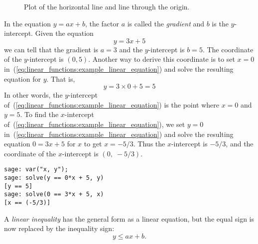\begin{figure}[!htbp]
\centering
\quad
\caption{Plot of the horizontal line and line through the origin.}
\end{figure}

In the equation $y = ax + b$, the factor $a$ is called the
\emph{gradient} and $b$ is the $y$-intercept. Given the equation
%
\begin{equation}
\label{eq:linear_functions:example_linear_equation}
y
=
3x + 5
\end{equation}
%
we can tell that the gradient is $a = 3$ and the $y$-intercept is
$b = 5$. The coordinate of the $y$-intercept is $(0, 5)$. Another way
to derive this coordinate is to set $x = 0$
in~(\ref{eq:linear_functions:example_linear_equation}) and solve the
resulting equation for $y$. That is,
\[
y
=
3 \times 0 + 5
=
5
\]
In other words, the $y$-intercept
of~(\ref{eq:linear_functions:example_linear_equation}) is the point
where $x = 0$ and $y = 5$. To find the $x$-intercept
of~(\ref{eq:linear_functions:example_linear_equation}), we set $y = 0$
in~(\ref{eq:linear_functions:example_linear_equation}) and solve the
resulting equation $0 = 3x + 5$ for $x$ to get $x = -5 / 3$. Thus the
$x$-intercept is $-5/3$, and the coordinate of the $x$-intercept is
$(0,\; -5/3)$.

\begin{lstlisting}
sage: var("x, y");
sage: solve(y == 0*x + 5, y)
[y == 5]
sage: solve(0 == 3*x + 5, x)
[x == (-5/3)]
\end{lstlisting}

A \emph{linear inequality} has the general form as a linear equation,
but the equal sign is now replaced by the inequality sign:
\[
y
\leq
ax + b.
\]
